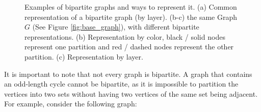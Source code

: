 \begin{figure}[!ht]
\begin{subfigure}{0.3\textwidth}
                \caption{}
                \label{fig:bipartition_by_color}
            \end{subfigure}
            \hfill
            \begin{subfigure}{0.3\textwidth}
                \centering
                \caption{}
                \label{fig:G_bipartite_by_layer}
            \end{subfigure}
            \caption{Examples of bipartite graphs and ways to represent it. (a) Common representation of a bipartite graph (by layer). (b-c) the same Graph $G$ (See Figure \ref{fig:base_graph}), with different bipartite representations. (b) Representation by color, black / solid nodes represent one partition and red / dashed nodes represent the other partition. (c) Representation by layer.}
        \end{figure}

        It is important to note that not every graph is bipartite. A graph that contains an odd-length cycle cannot be bipartite, as it is impossible to partition the vertices into two sets without having two vertices of the same set being adjacent. For example, consider the following graph:
        

